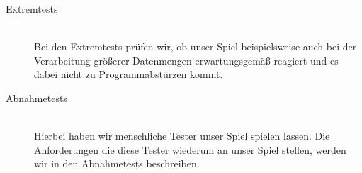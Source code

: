 \begin{description}
	\item[Extremtests] \hfill
	\\
	
	Bei den Extremtests prüfen wir, ob unser Spiel beispielsweise auch bei der Verarbeitung größerer Datenmengen erwartungsgemäß reagiert und es dabei nicht zu Programmabstürzen kommt.


	\item[Abnahmetests] \hfill
	\\
	
	Hierbei haben wir menschliche Tester unser Spiel spielen lassen. Die Anforderungen die diese Tester wiederum an unser Spiel stellen, werden wir in den Abnahmetests beschreiben. 
		
\end{description}







